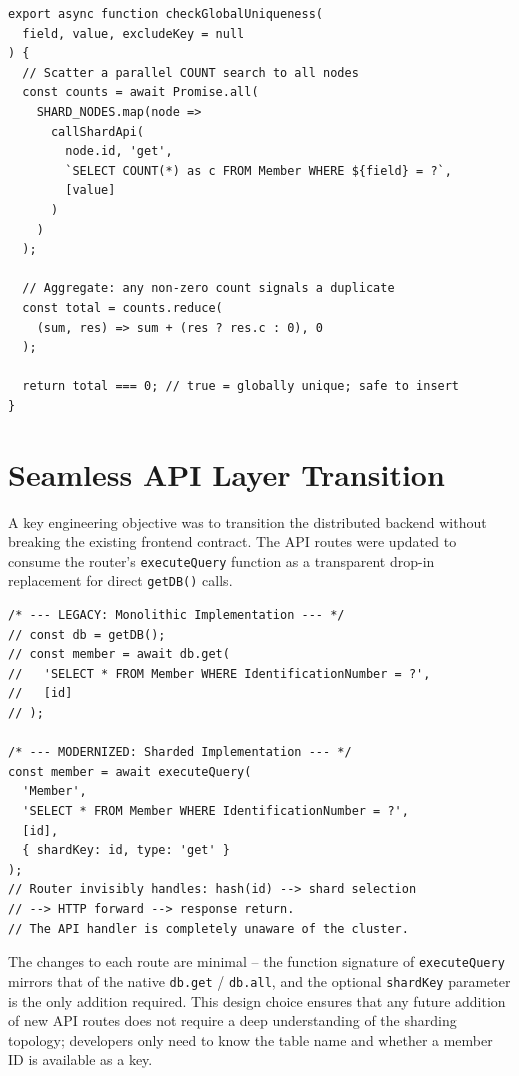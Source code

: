 \documentclass[sigconf]{acmart}
\begin{document}
\begin{lstlisting}[style=jsstyle, caption={Cross-Shard Global Uniqueness Enforcement (sharding/integrity.js)}]
export async function checkGlobalUniqueness(
  field, value, excludeKey = null
) {
  // Scatter a parallel COUNT search to all nodes
  const counts = await Promise.all(
    SHARD_NODES.map(node =>
      callShardApi(
        node.id, 'get',
        `SELECT COUNT(*) as c FROM Member WHERE ${field} = ?`,
        [value]
      )
    )
  );

  // Aggregate: any non-zero count signals a duplicate
  const total = counts.reduce(
    (sum, res) => sum + (res ? res.c : 0), 0
  );

  return total === 0; // true = globally unique; safe to insert
}
\end{lstlisting}

\section{Seamless API Layer Transition}

A key engineering objective was to transition the distributed backend without breaking the existing frontend contract. The API routes were updated to consume the router's \texttt{executeQuery} function as a transparent drop-in replacement for direct \texttt{getDB()} calls.

\begin{lstlisting}[style=jsstyle, caption={API Modernization: Legacy vs.\ Sharded (src/routes/members.js)}]
/* --- LEGACY: Monolithic Implementation --- */
// const db = getDB();
// const member = await db.get(
//   'SELECT * FROM Member WHERE IdentificationNumber = ?',
//   [id]
// );

/* --- MODERNIZED: Sharded Implementation --- */
const member = await executeQuery(
  'Member',
  'SELECT * FROM Member WHERE IdentificationNumber = ?',
  [id],
  { shardKey: id, type: 'get' }
);
// Router invisibly handles: hash(id) --> shard selection
// --> HTTP forward --> response return.
// The API handler is completely unaware of the cluster.
\end{lstlisting}

The changes to each route are minimal -- the function signature of \texttt{executeQuery} mirrors that of the native \texttt{db.get} / \texttt{db.all}, and the optional \texttt{shardKey} parameter is the only addition required. This design choice ensures that any future addition of new API routes does not require a deep understanding of the sharding topology; developers only need to know the table name and whether a member ID is available as a key.
\end{document}

